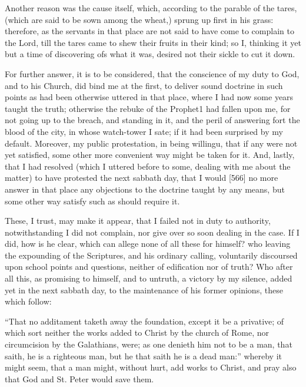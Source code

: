 Another reason was the cause itself, which, according to the parable of the tares, (which are said to be sown among the wheat,) sprung up first in his grass: therefore, as the servants in that place are not said to have come to complain to the Lord, till the tares came to shew their fruits in their kind; so I, thinking it yet but a time of discovering ofs what it was, desired not their sickle to cut it down.

For further answer, it is to be considered, that the conscience of my duty to God, and to his Church, did bind me at the first, to deliver sound doctrine in such points as had been otherwise uttered in that place, where I had now some years taught the truth; otherwise the rebuke of the Prophet1 had fallen upon me, for not going up to the breach, and standing in it, and the peril of answering fort the blood of the city, in whose watch-tower I sate; if it had been surprised by my default. Moreover, my public protestation, in being willingu, that if any were not yet satisfied, some other more convenient way might be taken for it. And, lastly, that I had resolved (which I uttered before to some, dealing with me about the matter) to have protested the next sabbath day, that I would [566] no more answer in that place any objections to the doctrine taught by any means, but some other way satisfy such as should require it.

These, I trust, may make it appear, that I failed not in duty to authority, notwithstanding I did not complain, nor give over so soon dealing in the case. If I did, how is he clear, which can allege none of all these for himself? who leaving the expounding of the Scriptures, and his ordinary calling, voluntarily discoursed upon school points and questions, neither of edification nor of truth? Who after all this, as promising to himself, and to untruth, a victory by my silence, added yet in the next sabbath day, to the maintenance of his former opinions, these which follow:

“That no additament taketh away the foundation, except it be a privative; of which sort neither the works added to Christ by the church of Rome, nor circumcision by the Galathians, were; as one denieth him not to be a man, that saith, he is a righteous man, but he that saith he is a dead man:” whereby it might seem, that a man might, without hurt, add works to Christ, and pray also that God and St. Peter would save them.


